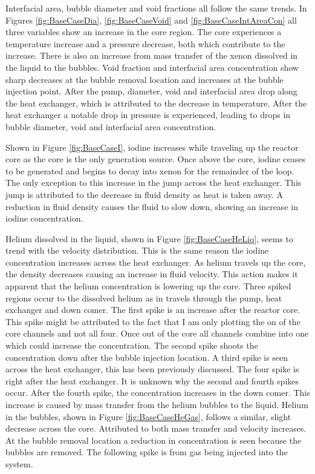 \FloatBarrier

Interfacial area, bubble diameter and void fractions all follow the same trends. In Figures \ref{fig:BaseCaseDia}, \ref{fig:BaseCaseVoid} and \ref{fig:BaseCaseIntAreaCon} all three variables show an increase in the core region. The core experiences a temperature increase and a pressure decrease, both which contribute to the increase. There is also an increase from mass transfer of the xenon dissolved in the liquid to the bubbles. Void fraction and interfacial area concentration show sharp decreases at the bubble removal location and increases at the bubble injection point. After the pump, diameter, void and interfacial area drop along the heat exchanger, which is attributed to the decrease in temperature. After the heat exchanger a notable drop in pressure is experienced, leading to drops in bubble diameter, void and interfacial area concentration. 

Shown in Figure \ref{fig:BaseCaseI}, iodine increases while traveling up the reactor core as the core is the only generation source. Once above the core, iodine ceases to be generated and begins to decay into xenon for the remainder of the loop. The only exception to this increase in the jump across the heat exchanger. This jump is attributed to the decrease in fluid density as heat is taken away. A reduction in fluid density causes the fluid to slow down, showing an increase in iodine concentration. 

Helium dissolved in the liquid, shown in Figure \ref{fig:BaseCaseHeLiq}, seems to trend with the velocity distribution. This is the same reason the iodine concentration increases across the heat exchanger. As helium travels up the core, the density decreases causing an increase in fluid velocity. This action makes it apparent that the helium concentration is lowering up the core. Three spiked regions occur to the dissolved helium as in travels through the pump, heat exchanger and down comer.  The first spike is an increase after the reactor core. This spike might be attributed to the fact that I am only plotting the on of the core channels and not all four. Once out of the core all channels combine into one which could increase the concentration. The second spike shoots the concentration down after the bubble injection location. A third spike is seen across the heat exchanger, this has been previously discussed. The four spike is right after the heat exchanger. It is unknown why the second and fourth spikes occur. After the fourth spike, the concentration increases in the down comer. This increase is caused by mass transfer from the helium bubbles to the liquid. Helium in the bubbles, shown in Figure \ref{fig:BaseCaseHeGas}, follows a similar, slight decrease across the core. Attributed to both mass transfer and velocity increases. At the bubble removal location a reduction in concentration is seen because the bubbles are removed. The following spike is from gas being injected into the system.

